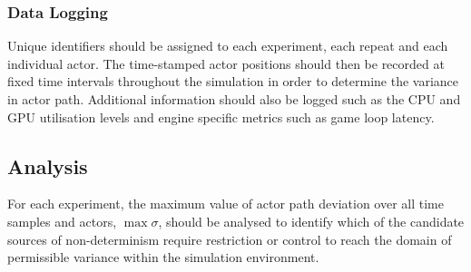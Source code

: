 \documentclass[runningheads,twocolumn,a4paper,10pt]{llncs}
\begin{document}

\subsubsection{Data Logging}
Unique identifiers should be assigned to each experiment, each repeat and each individual actor. 
The time-stamped actor positions should then be recorded at fixed time intervals throughout the simulation in order to determine the variance in actor path. Additional information should also be logged such as the CPU and GPU utilisation levels and engine specific metrics such as game loop latency.

\subsection{Analysis}
For each experiment, the maximum value of actor path deviation over all time samples and actors, $\max\sigma$, should be analysed to identify which of the candidate sources of non-determinism require restriction or control to reach the domain of permissible variance within the simulation environment. 


\end{document}
